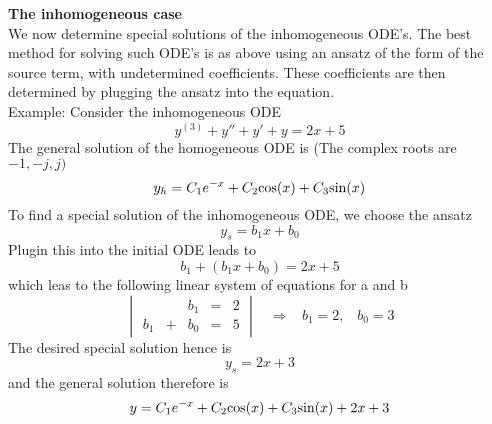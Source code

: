 \textbf{The inhomogeneous case}\\
We now determine special solutions of the inhomogeneous ODE's. The best method for solving such ODE's is as above using an ansatz of the form of the source term, with undetermined coefficients. These coefficients are then determined by plugging the ansatz into the equation.\\
Example: Consider the inhomogeneous ODE
\begin{equation}
  y^{(3)} + y'' + y' + y = 2x + 5
\end{equation}
The general solution of the homogeneous ODE is (The complex roots are $-1, -j, j)$
\begin{equation}
  y_h = C_1 e^{-x} + C_2\textup{cos}(x) + C_3 \textup{sin}(x)
\end{equation}
To find a special solution of the inhomogeneous ODE, we choose the ansatz
\begin{equation}
  y_s = b_1x + b_0
\end{equation}
Plugin this into the initial ODE leads to
\begin{equation}
  b_1 + (b_1x + b_0) = 2x + 5
\end{equation}
which leas to the following linear system of equations for a and b
\begin{equation}
  \begin{vmatrix}
        &   & b_1 & = & 2\\
    b_1 & + & b_0 & = & 5
  \end{vmatrix}
  \;\;\; \Rightarrow \;\;\;
  b_1 = 2, \;\;\; b_0 = 3
\end{equation}
The desired special solution hence is
\begin{equation}
  y_s = 2x + 3
\end{equation}
and the general solution therefore is
\begin{equation}
  y = C_1 e^{-x} + C_2\textup{cos}(x) + C_3 \textup{sin}(x) + 2x + 3
\end{equation}

